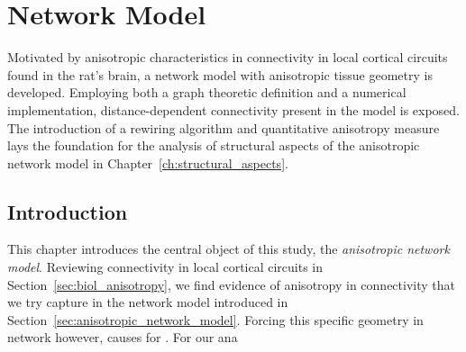 \chapter{Network Model}\label{ch:network_model} 

Motivated by anisotropic characteristics in connectivity in local
cortical circuits found in the rat's brain, a network model with
anisotropic tissue geometry is developed. Employing both a graph
theoretic definition and a numerical implementation,
distance-dependent connectivity present in the model is exposed. The
introduction of a rewiring algorithm and quantitative anisotropy
measure lays the foundation for the analysis of structural aspects of
the anisotropic network model in Chapter~\ref{ch:structural_aspects}.

\section{Introduction}\label{sec:intro_model}

This chapter introduces the central object of this study, the
\textit{anisotropic network model}. Reviewing connectivity in local
cortical circuits in Section~\ref{sec:biol_anisotropy}, we find
evidence of anisotropy in connectivity that we try capture in the
network model introduced in
Section~\ref{sec:anisotropic_network_model}. Forcing this specific
geometry in network however, causes for . For our ana




% 
% 
% 
% 
% 
% 
% 






















